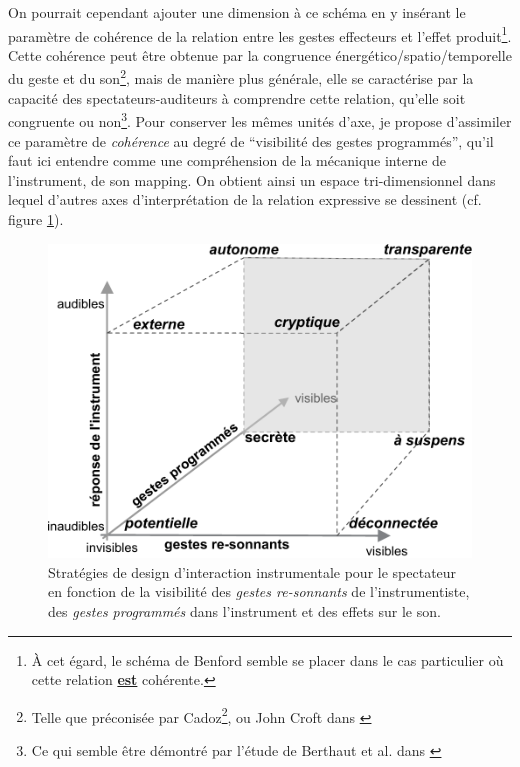 \indent On pourrait cependant ajouter une dimension à ce schéma en y insérant le paramètre de cohérence de la relation entre les gestes effecteurs et l'effet produit\footnote{À cet égard, le schéma de Benford semble se placer dans le cas particulier où cette relation  \underline{\textbf{est}} cohérente.}. Cette cohérence peut être obtenue par la congruence énergético/spatio/temporelle du geste et du son\footnote{Telle que préconisée par Cadoz\footnote{Cf. supra p. \pageref{sec:gesture:ergotic}.}, ou John Croft dans \cite{croft_theses_2007}}, mais de manière plus générale, elle se caractérise par la capacité des spectateurs-auditeurs à comprendre cette relation, qu'elle soit congruente ou non\footnote{Ce qui semble être démontré par l'étude de Berthaut et al. dans \cite{berthaut_rouages:_2013}}. Pour conserver les mêmes unités d'axe, je propose d'assimiler ce paramètre de \textit{cohérence} au degré de ``visibilité des gestes programmés'', qu'il faut ici entendre comme une compréhension de la mécanique interne de l'instrument, de son mapping. On obtient ainsi un espace tri-dimensionnel dans lequel d'autres axes d'interprétation de la relation expressive se dessinent (cf. figure \ref{fig:gesture:expressive-space}).\\
\begin{figure}[H]
	\captionsetup{format=plain}%
	\centering
	\begin{minipage}[t]{0.8\textwidth}
		\includegraphics[width=\linewidth]{gfx/03_gesture/SubversiveCube.pdf}
		\caption[Stratégies de design d'interaction instrumentale pour le spectateur]{Stratégies de design d'interaction instrumentale pour le spectateur en fonction de la visibilité des \textit{gestes re-sonnants} de l'instrumentiste, des \textit{gestes programmés} dans l'instrument et des effets sur le son.}
		\label{fig:gesture:expressive-space}
	\end{minipage}
\end{figure}
